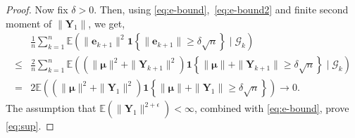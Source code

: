 \documentclass[10pt,a4paper]{amsart}
\begin{document}
\begin{proof}
Now fix $\delta > 0$. Then, using \eqref{eq:e-bound},~\eqref{eq:e-bound2} and finite second moment of $\|\boldsymbol{Y}_1\|$, we get,
\begin{align*}%
&\frac{1}{n}\sum_{k=1}^{n}\mathbb{E}\left( \|\boldsymbol{e}_{k+1}\|^2 \mathbf{1}\left\{\|\boldsymbol{e}_{k+1}\| \geq \delta\sqrt{n}\right\}\mid \mathcal{G}_{k}\right) \nonumber
\\ \leq& \frac{2}{n}\sum_{k=1}^{n}\mathbb{E}\left( \left(\|\boldsymbol{\mu}\|^2 + \|\boldsymbol{Y}_{k+1}\|^2\right) \mathbf{1}\left\{\|\boldsymbol{\mu}\| + \|\boldsymbol{Y}_{k+1}\| \geq \delta\sqrt{n}\right\}\mid \mathcal{G}_{k}\right) \nonumber
\\ =& 2\mathbb{E}\left( \left(\|\boldsymbol{\mu}\|^2 + \|\boldsymbol{Y}_{1}\|^2\right) \mathbf{1}\left\{\|\boldsymbol{\mu}\| + \|\boldsymbol{Y}_{1}\| \geq \delta\sqrt{n}\right\}\right) \to 0. \nonumber
\end{align*}
{The assumption that $\mathbb{E}\left(\|\boldsymbol{Y}_1\|^{2+\epsilon}\right) < \infty$, combined with \eqref{eq:e-bound}, prove \eqref{eq:sup}.}
\end{proof}
\end{document}
